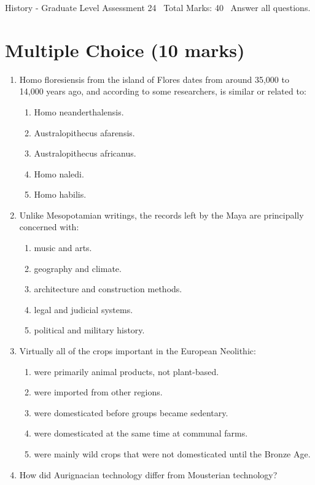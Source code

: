 \documentclass[12pt]{article}
\begin{document}
\begin{center}
History - Graduate Level Assessment 24 \
Total Marks: 40 \
Answer all questions.
\end{center}

\section*{Multiple Choice (10 marks)}
\begin{enumerate}[label=\arabic*.]
\item Homo floresiensis from the island of Flores dates from around 35,000 to 14,000 years ago, and according to some researchers, is similar or related to:
\begin{enumerate}[label=(\alph*)]
    \item Homo neanderthalensis.
    \item Australopithecus afarensis.
    \item Australopithecus africanus.
    \item Homo naledi.
    \item Homo habilis.
\end{enumerate}
\item Unlike Mesopotamian writings, the records left by the Maya are principally concerned with:
\begin{enumerate}[label=(\alph*)]
    \item music and arts.
    \item geography and climate.
    \item architecture and construction methods.
    \item legal and judicial systems.
    \item political and military history.
\end{enumerate}
\item Virtually all of the crops important in the European Neolithic:
\begin{enumerate}[label=(\alph*)]
    \item were primarily animal products, not plant-based.
    \item were imported from other regions.
    \item were domesticated before groups became sedentary.
    \item were domesticated at the same time at communal farms.
    \item were mainly wild crops that were not domesticated until the Bronze Age.
\end{enumerate}
\item How did Aurignacian technology differ from Mousterian technology?

\end{enumerate}
\end{document}
